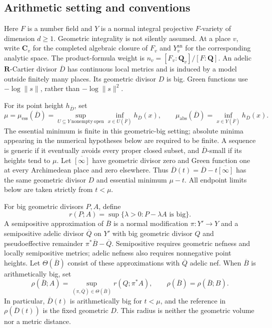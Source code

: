 \documentclass[11pt,a4paper]{article}
\theoremstyle{definition}
\theoremstyle{remark}
\begin{document}
\subsection*{Arithmetic setting and conventions}
Here $F$ is a number field and $Y$ is a normal integral projective
$F$-variety of dimension $d\geq1$. Geometric integrality is not silently
assumed. At a place $v$, write $\mathbf C_v$ for the completed algebraic
closure of $F_v$ and $Y_v^{\mathrm{an}}$ for the corresponding analytic
space. The product-formula weight is
$n_v=[F_v:\mathbf Q_v]/[F:\mathbf Q]$.
An adelic $\mathbf R$-Cartier divisor $\overline D$ has continuous local
metrics and is induced by a model outside finitely many places. Its
geometric divisor $D$ is big. Green functions use $-\log\|s\|$, rather
than $-\log\|s\|^2$.

For its point height $h_{\overline D}$, set
\[
 \mu=\mu_{\mathrm{ess}}(\overline D)
   =\sup_{U\subseteq Y\ \mathrm{nonempty\ open}}
       \inf_{x\in U(\overline F)}h_{\overline D}(x),
 \qquad
 \mu_{\mathrm{abs}}(\overline D)
   =\inf_{x\in Y(\overline F)}h_{\overline D}(x).
\]
The essential minimum is finite in this geometric-big setting; absolute
minima appearing in the numerical hypotheses below are required to be
finite. A sequence is generic if it eventually avoids every proper closed
subset, and $\overline D$-small if its heights tend to $\mu$.
Let $\overline{[\infty]}$ have geometric divisor zero and Green function
one at every Archimedean place and zero elsewhere. Thus
$\overline D(t)=\overline D-t\overline{[\infty]}$ has the same geometric
divisor $D$ and essential minimum $\mu-t$. All endpoint limits below are
taken strictly from $t<\mu$.

For big geometric divisors $P,A$, define
\[
 r(P;A)=\sup\{\lambda>0:P-\lambda A\text{ is big}\}.
\]
A semipositive approximation of $\overline B$ is a normal modification
$\pi:Y'\to Y$ and a semipositive adelic divisor $\overline Q$ on $Y'$
with big geometric divisor $Q$ and pseudoeffective remainder
$\pi^*\overline B-\overline Q$.
Semipositive requires geometric nefness and locally semipositive metrics;
adelic nefness also requires nonnegative point heights. Let
$\Theta(\overline B)$ consist of these approximations with
$\overline Q$ adelic nef. When $\overline B$ is arithmetically big, set
\[
 \rho(\overline B;A)
  =\sup_{(\pi,\overline Q)\in\Theta(\overline B)}r(Q;\pi^*A),
 \qquad
 \rho(\overline B)=\rho(\overline B;B).
\]
In particular, $\overline D(t)$ is arithmetically big for $t<\mu$,
and the reference in $\rho(\overline D(t))$ is the fixed geometric $D$.
This radius is neither the geometric volume nor a metric distance.
\end{document}
